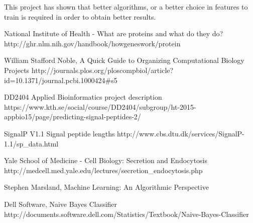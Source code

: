 \documentclass[10pt,letterpaper]{article}
\begin{document}
This project has shown that better algorithms, or a better choice in features to train is required in order to obtain better results. 

\nolinenumbers

%
%
% 
\begin{thebibliography}{10}
National Institute of Health - What are proteins and what do they do?
http://ghr.nlm.nih.gov/handbook/howgeneswork/protein

William Stafford Noble, A Quick Guide to Organizing Computational Biology Projects
http://journals.plos.org/ploscompbiol/article?id=10.1371/journal.pcbi.1000424\#s5

DD2404 Applied Bioinformatics project description
https://www.kth.se/social/course/DD2404/subgroup/ht-2015-appbio15/page/predicting-signal-peptides-2/

SignalP V1.1 Signal peptide lengths
http://www.cbs.dtu.dk/services/SignalP-1.1/sp\_data.html

Yale School of Medicine - Cell Biology: Secretion and Endocytosis
http://medcell.med.yale.edu/lectures/secretion\_endocytosis.php

Stephen Marsland, Machine Learning: An Algorithmic Perspective

Dell Software, Naive Bayes Classifier
http://documents.software.dell.com/Statistics/Textbook/Naive-Bayes-Classifier

\end{thebibliography}
\end{document}
